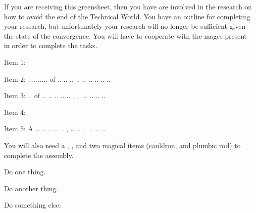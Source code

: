 \documentclass[green]{guildcamp3}
\begin{document}
\name{\gSaveTheWorldScientists{}}






If you are receiving this greensheet, then you have are involved in the research on how to avoid the end of the Technical World. You have an outline for completing your research, but unfortunately your research will no longer be sufficient given the state of the convergence. You will have to cooperate with the mages present in order to complete the tasks. 

Item 1:

Item 2: .......... of .. .. .. .. .. .. .. .. ..

Item 3: .. of .. .. .. .. ..  ,  .. .. .. .. ..

Item 4:  

Item 5: A .. .. .. .. ..  ,  .. .. .. .. .. ..

You will also need a \iMultitool{}, \iScrewdriver{}, and two magical items (cauldron, and plumbic rod) to complete the assembly. 

\begin{enum}[Directions]
  \item Do one thing.
  \item Do another thing.
  \item Do something else.
\end{enum}
\end{document}

